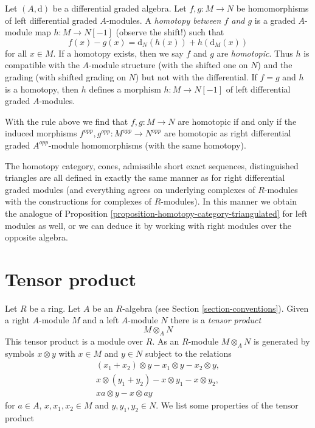\noindent
Let $(A, \text{d})$ be a differential graded algebra. Let
$f, g : M \to N$ be homomorphisms of left differential graded $A$-modules.
A {\it homotopy between $f$ and $g$} is a graded $A$-module map
$h : M \to N[-1]$ (observe the shift!) such that
$$
f(x) - g(x) = \text{d}_N(h(x)) + h(\text{d}_M(x))
$$
for all $x \in M$. If a homotopy exists, then we say $f$ and $g$ are
{\it homotopic}. Thus $h$ is compatible with the $A$-module structure
(with the shifted one on $N$) and the grading (with shifted grading on $N$)
but not with the differential. If $f = g$ and $h$ is a homotopy, then
$h$ defines a morphism $h : M \to N[-1]$ of left differential
graded $A$-modules.

\medskip\noindent
With the rule above we find that $f, g : M \to N$ are homotopic if
and only if the induced morphisms
$f^{opp}, g^{opp} : M^{opp} \to N^{opp}$
are homotopic as right differential graded $A^{opp}$-module homomorphisms
(with the same homotopy).

\medskip\noindent
The homotopy category, cones, admissible short exact sequences,
distinguished triangles are all defined in exactly the same manner
as for right differential graded modules (and everything agrees
on underlying complexes of $R$-modules with the constructions for
complexes of $R$-modules). In this manner we obtain the analogue of
Proposition \ref{proposition-homotopy-category-triangulated}
for left modules as well, or we can deduce it by working
with right modules over the opposite algebra.



\section{Tensor product}
\label{section-tensor-product}

\noindent
Let $R$ be a ring. Let $A$ be an $R$-algebra (see
Section \ref{section-conventions}). Given a right $A$-module $M$
and a left $A$-module $N$ there is a {\it tensor product}
$$
M \otimes_A N
$$
This tensor product is a module over $R$. As an $R$-module $M \otimes_A N$
is generated by symbols $x \otimes y$ with $x \in M$ and $y \in N$ subject
to the relations
$$
\begin{matrix}
(x_1 + x_2) \otimes y - x_1 \otimes y - x_2 \otimes y, \\
x \otimes (y_1 + y_2) - x \otimes y_1 - x \otimes y_2, \\
xa \otimes y - x \otimes ay
\end{matrix}
$$
for $a \in A$, $x, x_1, x_2 \in M$ and $y, y_1, y_2 \in N$.
We list some properties of the tensor product

